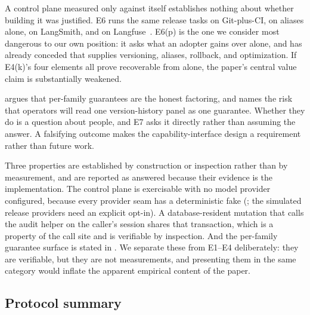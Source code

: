  A control plane measured only against
itself establishes nothing about whether building it was justified. E6 runs the
same release tasks on Git-plus-CI, on \mlflow{} aliases alone, on LangSmith, and on
Langfuse~\cite{mlflowpromptregistry,langsmithprompts,langfuseprompts}. E6(p) is the
one we consider most dangerous to our own position: it asks what an adopter gains
over \mlflow{} alone, and  has already conceded that
\mlflow{} supplies versioning, aliases, rollback, and optimization. If E4(k)'s four
elements all prove recoverable from \mlflow{} alone, the paper's central value
claim is substantially weakened.

  argues that per-family guarantees
are the honest factoring, and  names the risk that operators will
read one version-history panel as one guarantee. Whether they do is a question about
people, and E7 asks it directly rather than assuming the answer. A falsifying
outcome makes the capability-interface design a requirement rather than future work.

 Three properties are established by
construction or inspection rather than by measurement, and are reported as answered
because their evidence is the implementation. The control plane is exercisable with
no model provider configured, because every provider seam has a deterministic fake
(; the simulated release providers need an explicit opt-in). A database-resident mutation that calls the audit helper on the
caller's session shares that transaction, which is a property of the call site and
is verifiable by inspection. And the per-family guarantee surface is stated in
. We separate these from E1--E4 deliberately: they are
verifiable, but they are not measurements, and presenting them in the same category
would inflate the apparent empirical content of the paper.

\subsection{Protocol summary}

